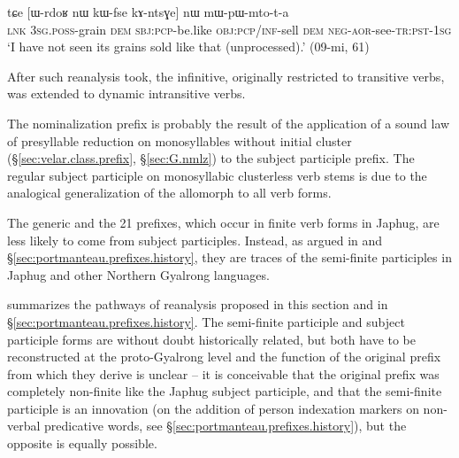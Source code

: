 \begin{exe}
\ex \label{ex:kAntsGe.nW.mWpWmtota} 
\gll tɕe [ɯ-rdoʁ nɯ kɯ-fse kɤ-ntsɣe] nɯ mɯ-pɯ-mto-t-a \\
\textsc{lnk} \textsc{3sg}.\textsc{poss}-grain \textsc{dem} \textsc{sbj}:\textsc{pcp}-be.like \textsc{obj}:\textsc{pcp}/\textsc{inf}-sell \textsc{dem} \textsc{neg}-\textsc{aor}-see-\textsc{tr}:\textsc{pst}-\textsc{1sg} \\
\glt `I have not seen its grains sold like that (unprocessed).' (09-mi, 61)
\end{exe}

After such reanalysis took, the  infinitive, originally restricted to transitive verbs, was extended to dynamic intransitive verbs. 

The nominalization  prefix is probably the result of the application of a sound law of presyllable reduction on monosyllables without initial cluster (§\ref{sec:velar.class.prefix}, §\ref{sec:G.nmlz}) to the subject participle prefix. The regular  subject participle on monosyllabic clusterless verb stems is due to the analogical generalization of the  allomorph to all verb forms.

The generic  and the 2\fl{}1  prefixes, which occur in finite verb forms in Japhug, are less likely to come from subject participles. Instead, as argued in \citet{jacques18generic} and §\ref{sec:portmanteau.prefixes.history}, they are traces of the semi-finite participles in Japhug and other Northern Gyalrong languages.

 summarizes the pathways of reanalysis proposed in this section and in §\ref{sec:portmanteau.prefixes.history}. The semi-finite participle and subject participle forms are without doubt historically related, but both have to be reconstructed at the proto-Gyalrong level and the function of the original prefix from which they derive is unclear -- it is conceivable that the original prefix was completely non-finite like the Japhug subject participle, and that the semi-finite participle is an innovation (on the addition of person indexation markers on non-verbal predicative words, see §\ref{sec:portmanteau.prefixes.history}), but the opposite is equally possible.

